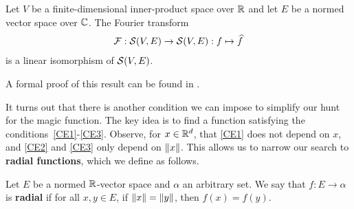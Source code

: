 \begin{boxtheorem}
    Let $V$ be a finite-dimensional inner-product space over $\mathbb{R}$ and let $E$ be a normed vector space over $\mathbb{C}$. The Fourier transform
    \begin{align*}
        \mathcal{F} : \mathcal{S}(V, E) \to \mathcal{S}(V, E) : f \mapsto \widehat{f}
    \end{align*}
    is a linear isomorphism of $\mathcal{S}(V, E)$. %
\end{boxtheorem}

A formal proof of this result can be found in \mathlib.

It turns out that there is another condition we can impose to simplify our hunt for the magic function. The key idea is to find a function satisfying the conditions~\ref{CE1}-\ref{CE3}. Observe, for $x \in \mathbb{R}^d$, that \ref{CE1} does not depend on $x$, and \ref{CE2} and \ref{CE3} only depend on $\left\lVert x \right\rVert$. This allows us to narrow our search to \textbf{radial functions}, which we define as follows.

\begin{boxdefinition}
    Let $E$ be a normed $\mathbb{R}$-vector space and $\alpha$ an arbitrary set. We say that $f : E \to \alpha$ is \textbf{radial} if for all $x, y \in E$, if $\left\lVert x \right\rVert = \left\lVert y \right\rVert$, then $f(x) = f(y)$.
\end{boxdefinition}